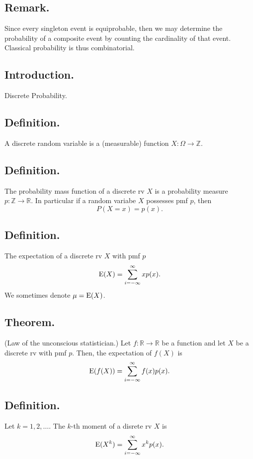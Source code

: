 \documentclass[titlepage]{article}
\begin{document}
\subsection{Remark.} Since every singleton event is equiprobable, then we may determine the probability of a composite event by counting the cardinality of that event. Classical probability is thus combinatorial.

\newpage {}

\subsection{Introduction.} Discrete Probability.

\subsection{Definition.} A discrete random variable is a (measurable) function $X: \Omega \to \mathbb{Z}.$

\subsection{Definition.} The probability mass function of a discrete rv $X$ is a probability measure $p: \mathbb{Z} \to \mathbb{R}$. In particular if a random variabe $X$ possesses pmf $p$, then 
$$P(X = x) = p(x).$$

\subsection{Definition.} The expectation of a discrete rv $X$ with pmf $p$
$$\text{E}(X) = \sum_{i=-\infty}^{\infty}xp(x).$$
We sometimes denote $\mu = \text{E}(X)$.

\subsection{Theorem.} (Law of the unconscious statistician.) Let $f: \mathbb{R} \to \mathbb{R}$ be a function and let $X$ be a discrete rv with pmf $p$. Then, the expectation of $f(X)$ is 
$$\text{E}(f(X)) = \sum_{i=-\infty}^{\infty}f(x)p(x).$$

\subsection{Definition.} Let $k = 1, 2, \ldots$. The $k$-th moment of a disrete rv $X$ is 
$$\text{E}(X^{k}) = \sum_{i=-\infty}^{\infty}x^{k}p(x).$$
\end{document}

